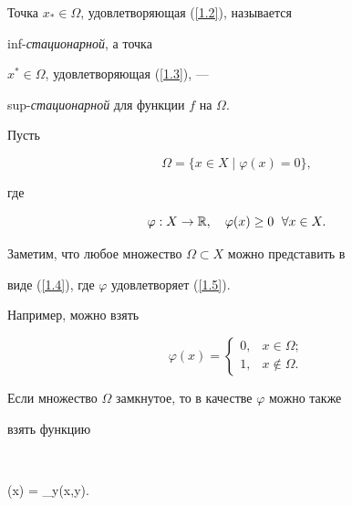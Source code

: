 Точка $x_{*}\in \Omega$, удовлетворяющая (\ref{1.2}), называется


inf-{\it стационарной}, а точка


$x^{*}\in\Omega$, удовлетворяющая (\ref{1.3}), ---


sup-{\it стационарной} для функции $f$ на $\Omega$.





Пусть


\begin{equation}\label{1.4}


\Omega = \{x\in X \mid \varphi(x) = 0\},


\end{equation}


где


\begin{equation}\label{1.5}


\varphi : X \rightarrow \Bbb R, \quad \varphi(x) \geq 0


\; \ \forall x\in X.


\end{equation}


Заметим, что любое множество $\Omega\subset X$ можно представить в


виде (\ref{1.4}), где $\varphi$ удовлетворяет (\ref{1.5}).


Например, можно взять


$$




\varphi(x)=


\begin{cases}


0, & x \in \Omega;\\


1, & x\notin \Omega. 


\end{cases}




$$


Если множество $\Omega$ замкнутое, то в качестве $\varphi$ можно также


взять функцию


$$




\varphi(x) = \inf\limits_{y\in\Omega}\rho(x,y).


